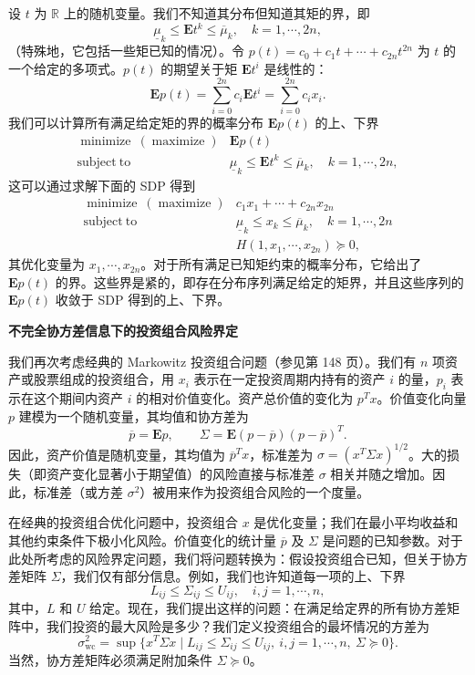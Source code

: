 \documentclass[UTF8,12pt,a4paper,fontset=fandol]{ctexart}
\begin{document}
设 $t$ 为 $\mathbb{R}$ 上的随机变量。我们不知道其分布但知道其矩的界，即
\[
\underline{\mu}_k\leq \mathbf{E}t^k\leq \overline{\mu}_k,\quad k=1,\cdots,2n,
\]
（特殊地，它包括一些矩已知的情况）。令 $p(t)=c_0+c_1t+\cdots+c_{2n}t^{2n}$ 为 $t$ 的一个给定的多项式。$p(t)$ 的期望关于矩 $\mathbf{E}t^i$ 是线性的：
\[
\mathbf{E}p(t)=\sum_{i=0}^{2n} c_i\mathbf{E}t^i=\sum_{i=0}^{2n}c_ix_i.
\]
我们可以计算所有满足给定矩的界的概率分布 $\mathbf{E}p(t)$ 的上、下界
\[
\begin{array}{ll}
\mathop{\mathrm{minimize}}\ (\mathop{\mathrm{maximize}}) & \mathbf{E}p(t)\\
\mathrm{subject\ to} & \underline{\mu}_k\leq \mathbf{E}t^k\leq \overline{\mu}_k,\quad k=1,\cdots,2n,
\end{array}
\]
这可以通过求解下面的 SDP 得到
\[
\begin{array}{ll}
\mathop{\mathrm{minimize}}\ (\mathop{\mathrm{maximize}}) & c_1x_1+\cdots+c_{2n}x_{2n}\\
\mathrm{subject\ to} & \underline{\mu}_k\leq x_k\leq \overline{\mu}_k,\quad k=1,\cdots,2n\\
& H(1,x_1,\cdots,x_{2n})\succeq 0,
\end{array}
\]
其优化变量为 $x_1,\cdots,x_{2n}$。对于所有满足已知矩约束的概率分布，它给出了 $\mathbf{E}p(t)$ 的界。这些界是紧的，即存在分布序列满足给定的矩界，并且这些序列的 $\mathbf{E}p(t)$ 收敛于 SDP 得到的上、下界。

\noindent\textbf{不完全协方差信息下的投资组合风险界定}

我们再次考虑经典的 Markowitz 投资组合问题（参见第 148 页）。我们有 $n$ 项资产或股票组成的投资组合，用 $x_i$ 表示在一定投资周期内持有的资产 $i$ 的量，$p_i$ 表示在这个期间内资产 $i$ 的相对价值变化。资产总价值的变化为 $p^Tx$。价值变化向量 $p$ 建模为一个随机变量，其均值和协方差为
\[
\overline{p}=\mathbf{E}p,\qquad \Sigma=\mathbf{E}(p-\overline{p})(p-\overline{p})^T.
\]
因此，资产价值是随机变量，其均值为 $\overline{p}^Tx$，标准差为 $\sigma=(x^T\Sigma x)^{1/2}$。大的损失（即资产变化显著小于期望值）的风险直接与标准差 $\sigma$ 相关并随之增加。因此，标准差（或方差 $\sigma^2$）被用来作为投资组合风险的一个度量。

在经典的投资组合优化问题中，投资组合 $x$ 是优化变量；我们在最小平均收益和其他约束条件下极小化风险。价值变化的统计量 $\overline{p}$ 及 $\Sigma$ 是问题的已知参数。对于此处所考虑的风险界定问题，我们将问题转换为：假设投资组合已知，但关于协方差矩阵 $\Sigma$，我们仅有部分信息。例如，我们也许知道每一项的上、下界
\[
L_{ij}\leq \Sigma_{ij}\leq U_{ij},\quad i,j=1,\cdots,n,
\]
其中，$L$ 和 $U$ 给定。现在，我们提出这样的问题：在满足给定界的所有协方差矩阵中，我们投资的最大风险是多少？我们定义投资组合的最坏情况的方差为
\[
\sigma_{\mathrm{wc}}^2=\sup\{x^T\Sigma x\mid L_{ij}\leq \Sigma_{ij}\leq U_{ij},\ i,j=1,\cdots,n,\ \Sigma\succeq 0\}.
\]
当然，协方差矩阵必须满足附加条件 $\Sigma\succeq 0$。
\end{document}
